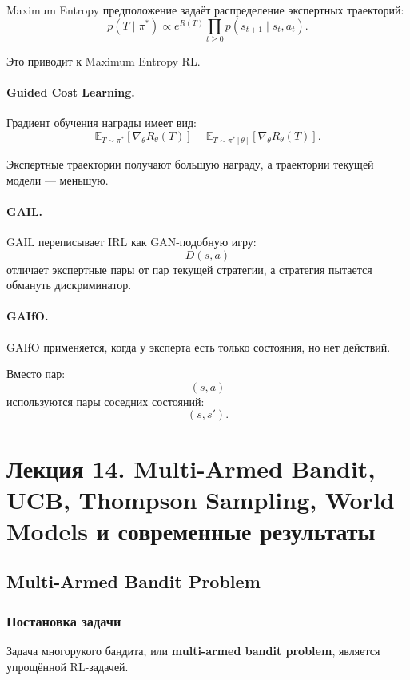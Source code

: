 \documentclass[12pt,a4paper]{article}
\begin{document}
Maximum Entropy предположение задаёт распределение экспертных траекторий:
\[
p(T\mid\pi^\ast)
\propto
e^{R(T)}
\prod_{t\ge 0}
p(s_{t+1}\mid s_t,a_t).
\]

Это приводит к Maximum Entropy RL.

\paragraph{Guided Cost Learning.}

Градиент обучения награды имеет вид:
\[
\mathbb E_{T\sim\pi^\ast}
\left[
\nabla_\theta R_\theta(T)
\right]
-
\mathbb E_{T\sim\pi^\ast[\theta]}
\left[
\nabla_\theta R_\theta(T)
\right].
\]

Экспертные траектории получают большую награду, а траектории текущей модели --- меньшую.

\paragraph{GAIL.}

GAIL переписывает IRL как GAN-подобную игру:
\[
D(s,a)
\]
отличает экспертные пары от пар текущей стратегии, а стратегия пытается обмануть дискриминатор.

\paragraph{GAIfO.}

GAIfO применяется, когда у эксперта есть только состояния, но нет действий.

Вместо пар:
\[
(s,a)
\]
используются пары соседних состояний:
\[
(s,s').
\]



\section{Лекция 14. Multi-Armed Bandit, UCB, Thompson Sampling, World Models и современные результаты}

\subsection{Multi-Armed Bandit Problem}

\subsubsection{Постановка задачи}

Задача многорукого бандита, или \textbf{multi-armed bandit problem}, является упрощённой RL-задачей.
\end{document}
